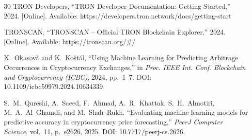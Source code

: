 \documentclass[journal]{IEEEtran}
\begin{document}
\begin{thebibliography}{30}
    TRON Developers, ``TRON Developer Documentation: Getting Started,'' 2024. [Online]. Available: https://developers.tron.network/docs/getting-start
    
    TRONSCAN, ``TRONSCAN -- Official TRON Blockchain Explorer,'' 2024. [Online]. Available: https://tronscan.org/\#/
    
    K.~Okasov{\'a} and K.~Ko{\v{s}}t{\'a}l, ``Using Machine Learning for Predicting Arbitrage Occurrences in Cryptocurrency Exchanges,'' in \textit{Proc. IEEE Int. Conf. Blockchain and Cryptocurrency (ICBC)}, 2024, pp.~1--7. DOI: 10.1109/icbc59979.2024.10634339.
    
    S.~M.~Qureshi, A.~Saeed, F.~Ahmad, A.~R.~Khattak, S.~H.~Almotiri, M.~A.~Al~Ghamdi, and M.~Shah~Rukh, ``Evaluating machine learning models for predictive accuracy in cryptocurrency price forecasting,'' \textit{PeerJ Computer Science}, vol.~11, p.~e2626, 2025. DOI: 10.7717/peerj-cs.2626.
    \end{thebibliography}
    
    
\end{document}
